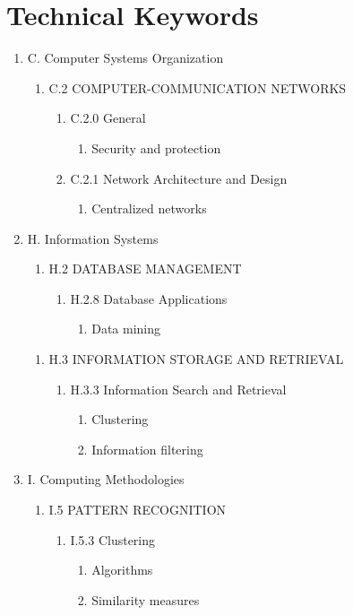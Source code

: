 \documentclass[12pt,a4paper,final]{report}
\begin{document}
\section{Technical Keywords}
\begin{enumerate}
\item C. Computer Systems Organization 
\begin{enumerate}
\item C.2 COMPUTER-COMMUNICATION NETWORKS 
\begin{enumerate}
\item C.2.0 General  
\begin{enumerate}
\item  Security and protection
\end{enumerate} 
\item C.2.1 Network Architecture and Design
\begin{enumerate}
\item  Centralized networks
\end{enumerate} 
\end{enumerate} 
\end{enumerate}
	
\item H. Information Systems  
\begin{enumerate}
\item H.2 DATABASE MANAGEMENT
\begin{enumerate}		
\item H.2.8 Database Applications   
\begin{enumerate}
\item  Data mining
\end{enumerate} 
	 		
\end{enumerate} 
\end{enumerate}	
\begin{enumerate}
\item H.3 INFORMATION STORAGE AND RETRIEVAL 
\begin{enumerate}		
\item H.3.3 Information Search and Retrieval  
\begin{enumerate}
\item  Clustering
\item Information filtering
\end{enumerate} 
	 		
\end{enumerate} 
\end{enumerate}
	
\item I. Computing Methodologies  
\begin{enumerate}
\item I.5 PATTERN RECOGNITION 
\begin{enumerate}		
\item I.5.3 Clustering   
\begin{enumerate}
\item Algorithms
\item Similarity measures 
\end{enumerate} 
	 		
\end{enumerate} 
\end{enumerate}	
\end{enumerate}
\end{document}
